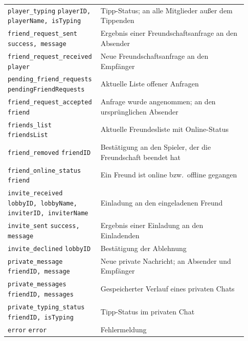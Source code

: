 {\begin{longtable}{p{0.33\linewidth}p{0.6\linewidth}}
  \texttt{player\_typing} \newline \texttt{playerID, playerName, isTyping} & Tipp-Status; an alle Mitglieder außer dem Tippenden \\
  \texttt{friend\_request\_sent} \newline \texttt{success, message} & Ergebnis einer Freundschaftsanfrage an den Absender \\
  \texttt{friend\_request\_received} \newline \texttt{player} & Neue Freundschaftsanfrage an den Empfänger \\
  \texttt{pending\_friend\_requests} \newline \texttt{pendingFriendRequests} & Aktuelle Liste offener Anfragen \\
  \texttt{friend\_request\_accepted} \newline \texttt{friend} & Anfrage wurde angenommen; an den ursprünglichen Absender \\
  \texttt{friends\_list} \newline \texttt{friendsList} & Aktuelle Freundesliste mit Online-Status \\
  \texttt{friend\_removed} \newline \texttt{friendID} & Bestätigung an den Spieler, der die Freundschaft beendet hat \\
  \texttt{friend\_online\_status} \newline \texttt{friend} & Ein Freund ist online bzw.\ offline gegangen \\
  \texttt{invite\_received} \newline \texttt{lobbyID, lobbyName, inviterID, inviterName} & Einladung an den eingeladenen Freund \\
  \texttt{invite\_sent} \newline \texttt{success, message} & Ergebnis einer Einladung an den Einladenden \\
  \texttt{invite\_declined} \newline \texttt{lobbyID} & Bestätigung der Ablehnung \\
  \texttt{private\_message} \newline \texttt{friendID, message} & Neue private Nachricht; an Absender und Empfänger \\
  \texttt{private\_messages} \newline \texttt{friendID, messages} & Gespeicherter Verlauf eines privaten Chats \\
  \texttt{private\_typing\_status} \newline \texttt{friendID, isTyping} & Tipp-Status im privaten Chat \\
  \texttt{error} \newline \texttt{error} & Fehlermeldung \\
  \bottomrule
\end{longtable}
}
